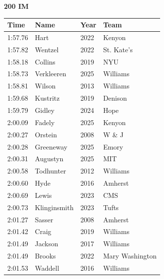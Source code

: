 \noindent\begin{minipage}[t]{0.98\textwidth}
\centering
\textbf{\textcolor{teamprimary}{200 IM}}\par
\vspace{0.5em}
\centering
\small
\renewcommand{\arraystretch}{1.0}
\setlength{\tabcolsep}{4pt}
\begin{tabular}{@{}p{2.5cm}p{4.5cm}p{1.5cm}p{2.5cm}@{}}
\toprule
\textbf{Time} & \textbf{Name} & \textbf{Year} & \textbf{Team} \\
\midrule
1:57.76 & Hart & 2022 & Kenyon \\
1:57.82 & Wentzel & 2022 & St. Kate's \\
1:58.18 & Collins & 2019 & NYU \\
1:58.73 & Verkleeren & 2025 & Williams \\
1:58.81 & Wilson & 2013 & Williams \\
1:59.68 & Kustritz & 2019 & Denison \\
1:59.79 & Gidley & 2024 & Hope \\
2:00.09 & Fadely & 2025 & Kenyon \\
2:00.27 & Orstein & 2008 & W \& J \\
2:00.28 & Greeneway & 2025 & Emory \\
2:00.31 & Augustyn & 2025 & MIT \\
2:00.58 & Todhunter & 2012 & Williams \\
2:00.60 & Hyde & 2016 & Amherst \\
2:00.69 & Lewis & 2023 & CMS \\
2:00.73 & Klinginsmith & 2023 & Tufts \\
2:01.27 & Sasser & 2008 & Amherst \\
2:01.42 & Craig & 2019 & Williams \\
2:01.49 & Jackson & 2017 & Williams \\
2:01.49 & Brooks & 2022 & Mary Washington \\
2:01.53 & Waddell & 2016 & Williams \\
\bottomrule
\end{tabular}
\end{minipage}
\vspace{1.2em}
